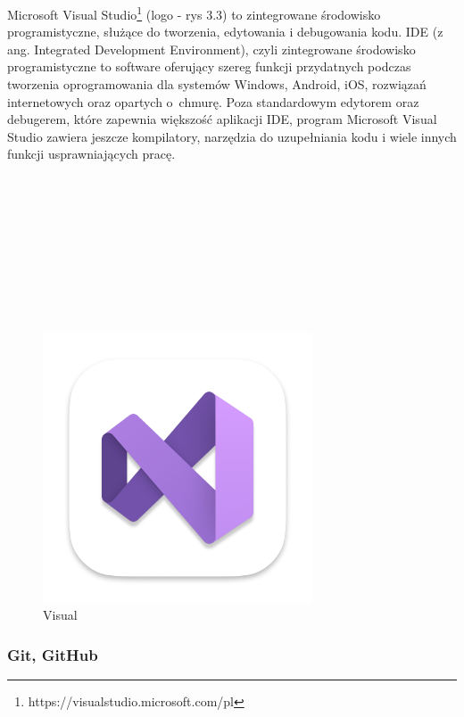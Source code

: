 Microsoft Visual Studio\footnote{ https://visualstudio.microsoft.com/pl\cite{www3}} (logo - rys 3.3) to zintegrowane środowisko programistyczne, służące do tworzenia, edytowania i debugowania kodu. IDE (z ang. Integrated Development Environment), czyli zintegrowane środowisko programistyczne to software oferujący szereg funkcji przydatnych podczas tworzenia oprogramowania dla systemów Windows, Android, iOS, rozwiązań internetowych oraz opartych o~chmurę. Poza standardowym edytorem oraz debugerem, które zapewnia większość aplikacji IDE, program Microsoft Visual Studio zawiera jeszcze kompilatory, narzędzia do uzupełniania kodu i wiele innych funkcji usprawniających pracę.
\\
\\
\\
\\
\\
\\
\\
\\
\\
\\
	\begin{figure}[!htb]
	\begin{center}
		\includegraphics[width=8cm]{rys/visual.png}
		\caption{Visual}
		\label{rys:rysunek001}
	\end{center}
\end{figure}

\subsubsection{Git, GitHub}

